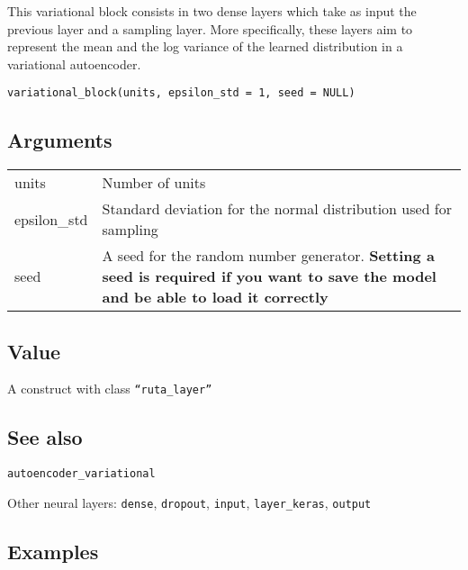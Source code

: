 This variational block consists in two dense layers which take as input
the previous layer and a sampling layer. More specifically, these layers
aim to represent the mean and the log variance of the learned
distribution in a variational autoencoder.

\begin{verbatim}
variational_block(units, epsilon_std = 1, seed = NULL)
\end{verbatim}

\hypertarget{arguments}{\subsection{\texorpdfstring{\protect\hyperlink{arguments}{}Arguments}{Arguments}}\label{arguments}}

\begin{longtable}[c]{@{}>{\small}p{3cm}>{\raggedright}p{12.5cm}@{}}
\toprule
units & Number of units\tabularnewline
epsilon\_std & Standard deviation for the normal distribution used for
sampling\tabularnewline
seed & A seed for the random number generator. \textbf{Setting a seed is
required if you want to save the model and be able to load it
correctly}\tabularnewline
\bottomrule
\end{longtable}

\hypertarget{value}{\subsection{\texorpdfstring{\protect\hyperlink{value}{}Value}{Value}}\label{value}}

A construct with class \texttt{``ruta\_layer''}

\hypertarget{see-also}{\subsection{\texorpdfstring{\protect\hyperlink{see-also}{}See
also}{See also}}\label{see-also}}

\texttt{autoencoder\_variational}

Other neural layers: \texttt{dense}, \texttt{dropout}, \texttt{input},
\texttt{layer\_keras}, \texttt{output}

\hypertarget{examples}{\subsection{\texorpdfstring{\protect\hyperlink{examples}{}Examples}{Examples}}\label{examples}}

